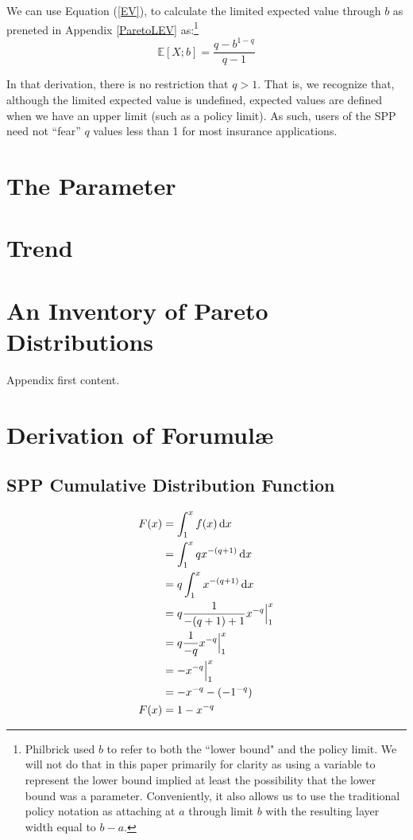 \documentclass[]{article} %
\begin{document}
We can use Equation (\ref{EV}), to calculate the limited expected value through $b$
as preneted in Appendix \ref{ParetoLEV} as:\footnote{Philbrick used $b$ to refer to both the ``lower bound" and the policy limit. We will not do that in this paper primarily for clarity as using a variable to represent the lower bound implied at least the possibility that the lower bound was a parameter. Conveniently, it also allows us  to use the traditional policy notation as attaching at $a$ through limit $b$ with the resulting layer width equal to $b - a$.} 
\begin{equation}
	\mathbb{E}[X;b] = \frac{q - b^{1-q}}{q-1}
\end{equation}

In that derivation, there is no restriction that $q > 1$. That is, we recognize that, although the limited expected value is undefined, expected values are defined when we have an upper limit (such as a policy limit). As such, users of the SPP need not ``fear'' $q$ values less than 1 for most insurance applications.

\section{The Parameter}
\section{Trend}

\newpage
\appendix
\appendixpage

\section{An Inventory of Pareto Distributions}\label{ParetoInventory}
Appendix first content.
\section{Derivation of Forumul\ae}
\subsection{SPP Cumulative Distribution Function}\label{ParetoF}
\begin{align}
	F(x) &= \int_{1}^{x} f(x) \operatorname{d \!} x \nonumber\\
		&= \int_{1}^{x}qx^{-(q+1)} \operatorname{d \!} x\nonumber\\
		&= q \int_{1}^{x}x^{-(q+1)} \operatorname{d \!} x\nonumber\\
		&= q \frac{1}{-(q+1)+1} x^{-q} \Big|_{1}^{x}\nonumber\\
		&=  q \frac{1}{-q} x^{-q} \Big|_{1}^{x}\nonumber\\
		&=  - x^{-q}\Big|_{1}^{x}\nonumber\\
		&= -x^{-q} - (-1^{-q})\nonumber\\
	 F(x) &=  1 - x^{-q}
\end{align}
\end{document}
